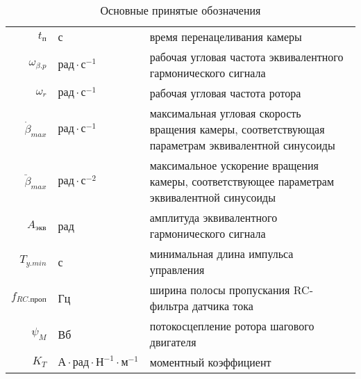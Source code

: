 \begin{table}[ht!]
\begin{tabular}{rll}
    $t_\text{п}$        & с & время перенацеливания камеры \\
    
    $\omega_{\beta.p}$  & $ \text{рад} \cdot \text{с}^{-1} $ & рабочая угловая
                            частота эквивалентного гармонического сигнала \\
    
    $\omega_{r}$ & $ \text{рад} \cdot \text{с}^{-1} $ & рабочая угловая
                            частота ротора \\
    
    $\dot{\beta}_{max}$ & $\text{рад} \cdot \text{с}^{-1}$ & максимальная угловая
                            скорость вращения камеры, соответствующая параметрам эквивалентной синусоиды \\
    
    $\ddot{\beta}_{max}$ & $ \text{рад} \cdot \text{с}^{-2} $ & максимальное ускорение
                            вращения камеры, соответствующее параметрам эквивалентной синусоиды \\
    
    $A_{\text{экв}}$     & рад & амплитуда эквивалентного гармонического сигнала \\
    
    $T_{y.min}$          & с & минимальная длина импульса управления \\
    
    $f_{RC.\text{проп}}$ & Гц & ширина полосы пропускания RC-фильтра датчика тока \\
    
    $\psi_{M}$           & Вб & потокосцепление ротора шагового двигателя \\
    $K_{T}$              & $\text{А} \cdot \text{рад} \cdot \text{Н}^{-1} \cdot \text{м}^{-1}$ & моментный коэффициент \\

    \end{tabular}
    \caption{ Основные принятые обозначения }
\end{table}

